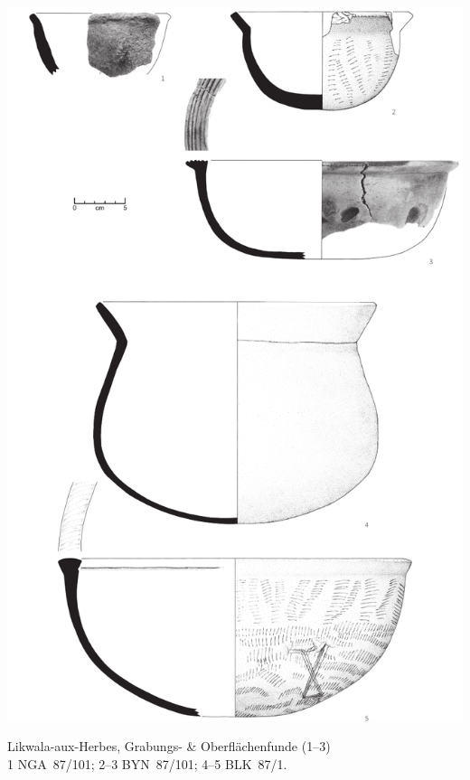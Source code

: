 \begin{pl}[H]
	\includegraphics{plt/Taf68.pdf}
	\vspace{.75em}\caption{Likwala-aux-Herbes, Grabungs- \& Oberflächenfunde (1--3) \\ 1 NGA~87/101; 2--3 BYN~87/101; 4--5 BLK~87/1.}
	\label{pl:68}
\end{pl}

